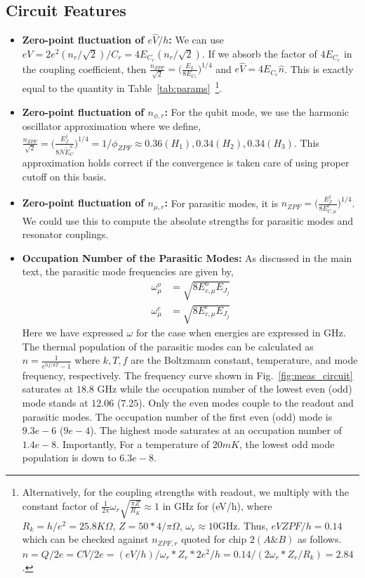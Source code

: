 \documentclass[%
reprint,
superscriptaddress,
 amsmath,amssymb,
 aps,
 prx,
longbibliography,
floatfix,
]{revtex4-2}
\begin{document}
\subsection{Circuit Features}
\begin{itemize}
    \item \textbf{Zero-point fluctuation of $e\hat V/h$:} We can use $eV=2e^2(n_r/\sqrt{2})/C_r=4E_{C_r}(n_r/\sqrt{2})$. If we absorb the factor of $4E_{C_r}$ in the coupling coefficient, then $\frac{n_{ZPF}}{\sqrt{2}}=\Big(\frac{E_L}{8E_{C_r}}\Big)^{1/4}$ and $e\hat V=4E_{C_r}\hat n$. This is exactly equal to the quantity in Table~\ref{tab:params}~\footnote{Alternatively, for the coupling strengths with readout, we multiply with the constant factor of $\frac{1}{2\pi}\omega_r\sqrt{\frac{\pi Z}{R_K}}\approx 1$ in GHz for (eV/h), where $R_k=h/e^2=25.8K\Omega$, $Z=50*4/\pi\Omega$, $\omega_r\approx 10$GHz. Thus, $eVZPF/h=0.14$ which can be checked against $n_{ZPF,r}$ quoted for chip $2(A\&B)$ as follows. $n=Q/2e=CV/2e=(eV/h)/{\omega_r*Z_r*2e^2/h}=0.14/(2\omega_r*Z_r/R_k)=2.84$.}.
    \item \textbf{Zero-point fluctuation of $n_{\phi,r}$:} For the qubit mode, we use the harmonic oscillator approximation where we define, $\frac{n_{ZPF}}{\sqrt{2}}=\Big(\frac{E_J^j}{8N\tilde{E}_{C}^\phi}\Big)^{1/4}=1/\phi_{ZPF}\approx 0.36(H_1), 0.34 (H_2), 0.34 (H_3)$. This approximation holds correct if the convergence is taken care of using proper cutoff on this basis. 
    \item \textbf{Zero-point fluctuation of $n_{\mu,r}$:} For parasitic modes, it is $n_{ZPF}=\Big(\frac{E_J^j}{8E_{C,\mu}^e}\Big)^{1/4}$. We could use this to compute the absolute strengths for parasitic modes and resonator couplings. 

\item\textbf{Occupation Number of the Parasitic Modes:}
As discussed in the main text, the parasitic mode frequencies are given by,
\begin{align}
    \omega^o_\mu&=\sqrt{8E_{c,\mu}^oE_{J_j}}\\
    \omega^e_\mu&=\sqrt{8E_{c,\mu}^eE_{J_j}}
\end{align}
 Here we have expressed $\omega$ for the case when energies are expressed in GHz. The thermal population of the parasitic modes can be calculated as $n=\frac{1}{e^{hf/kT}-1}$ where $k, T, f$ are the Boltzmann constant, temperature, and mode frequency, respectively. The frequency curve shown in Fig.~\ref{fig:meas_circuit} saturates at $18.8$ GHz while the occupation number of the lowest even (odd) mode stands at $12.06$ ($7.25$). Only the even modes couple to the readout and parasitic modes. The occupation number of the first even (odd) mode is $9.3e-6$ ($9e-4$). The highest mode saturates at an occupation number of $1.4e-8$. Importantly,  For a temperature of $20mK$, the lowest odd mode population is down to $6.3e-8$.

\end{itemize}
\end{document}
